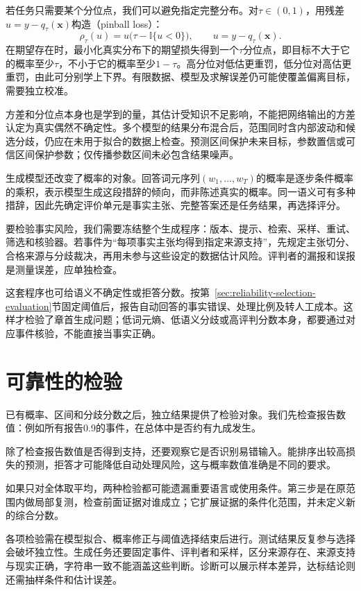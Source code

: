 若任务只需要某个分位点，我们可以避免指定完整分布。对$\tau\in(0,1)$，用残差$u=y-q_\tau(\bm{x})$构造（pinball loss）：
\[
\rho_\tau(u)=u\bigl(\tau-\mathbb I\{u<0\}\bigr),
 \qquad u=y-q_\tau(\bm{x}).
\]
在期望存在时，最小化真实分布下的期望损失得到一个$\tau$分位点，即目标不大于它的概率至少$\tau$，不小于它的概率至少$1-\tau$。高分位对低估更重罚，低分位对高估更重罚，由此可分别学上下界。有限数据、模型及求解误差仍可能使覆盖偏离目标，需要独立校准。

方差和分位点本身也是学到的量，其估计受知识不足影响，不能把网络输出的方差认定为真实偶然不确定性。多个模型的结果分布混合后，范围同时含内部波动和候选分歧，仍应在未用于拟合的数据上检查。预测区间保护未来目标，参数置信或可信区间保护参数；仅传播参数区间未必包含结果噪声。

生成模型还改变了概率的对象。回答词元序列$(w_1,\ldots,w_T)$的概率是逐步条件概率的乘积，表示模型生成这段措辞的倾向，而非陈述真实的概率。同一语义可有多种措辞，因此先确定评价单元是事实主张、完整答案还是任务结果，再选择评分。

要检验事实风险，我们需要冻结整个生成程序：版本、提示、检索、采样、重试、筛选和核验器。若事件为“每项事实主张均得到指定来源支持”，先规定主张切分、合格来源与分歧裁决，再用未参与这些设定的数据估计风险。评判者的漏报和误报是测量误差，应单独检查。

这套程序也可给语义不确定性或拒答分数。按第~\ref{sec:reliability-selection-evaluation}节固定阈值后，报告自动回答的事实错误、处理比例及转人工成本。这样才检验了章首生成问题；低词元熵、低语义分歧或高评判分数本身，都要通过对应事件核验，不能直接当事实正确。

\section{可靠性的检验}
\label{sec:reliability-evaluation}

已有概率、区间和分歧分数之后，独立结果提供了检验对象。我们先检查报告数值：例如所有报告0.9的事件，在总体中是否约有九成发生。

除了检查报告数值是否得到支持，还要观察它是否识别易错输入。能排序出较高损失的预测，拒答才可能降低自动处理风险，这与概率数值准确是不同的要求。

如果只对全体取平均，两种检验都可能遗漏重要语言或使用条件。第三步是在原范围内做局部复测，检查前面证据对谁成立；它扩展证据的条件化范围，并未定义新的综合分数。

各项检验需在模型拟合、概率修正与阈值选择结束后进行。测试结果反复参与选择会破坏独立性。生成任务还要固定事件、评判者和采样，区分来源存在、来源支持与现实正确，字符串一致不能涵盖这些判断。诊断可以展示样本差异，达标结论则还需抽样条件和估计误差。

